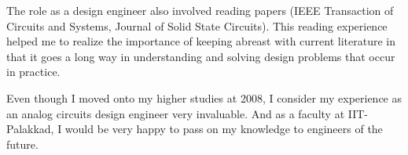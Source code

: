 \documentclass[onecolumn,12pt]{IEEEtran}
\begin{document}
The role as a design engineer also involved reading papers (IEEE Transaction of Circuits and Systems, Journal of Solid State Circuits). This reading experience helped me to realize the importance of keeping abreast with current literature in that it goes a long way in understanding and solving design problems that occur in practice.\par
Even though I moved onto my higher studies at 2008, I consider my experience as an analog circuits design engineer very invaluable. And as a faculty at IIT-Palakkad, I would be very happy to pass on my knowledge to engineers of the future.
\end{document}

